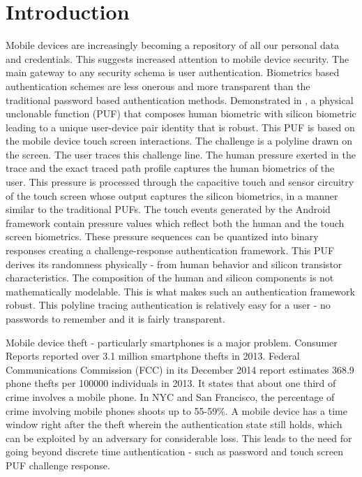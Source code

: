 \documentclass{acm_proc_article-sp}
\begin{document}
\section{Introduction}
\label{sec:intro}
Mobile devices are increasingly becoming a repository of all our personal data and credentials.
This suggests increased attention to mobile device security.
The main gateway to any security schema is user authentication.
Biometrics based authentication schemes are less onerous and 
more transparent than the traditional password based authentication methods. 
Demonstrated in \cite{ScheelTyagi15}, a physical unclonable function (PUF) that composes human biometric with silicon biometric
leading to a unique user-device pair identity that is robust.
This PUF is based on the mobile device touch screen interactions.
The challenge is a polyline drawn on the screen. The user
traces this challenge line. The human pressure exerted in the trace and the exact traced path
profile captures the human biometrics of the user. This pressure is
processed through the capacitive touch
and sensor circuitry of the touch screen whose output captures the silicon biometrics, in a 
manner similar to the traditional PUFs. The touch events generated by the Android framework
contain pressure values which reflect both the human and the touch screen biometrics.
These pressure sequences can be quantized into binary responses
creating a challenge-response authentication framework. 
This PUF derives its randomness physically - from human behavior and silicon
transistor characteristics. 
The composition of the human and silicon components is not mathematically
modelable. This is what makes such an authentication framework robust. This polyline tracing authentication is relatively easy for a user - no passwords to remember
and it is fairly transparent.
 
Mobile device theft - particularly smartphones is a major problem. Consumer Reports \cite{CR14}
reported over 3.1 million smartphone thefts in 2013. Federal Communications Commission (FCC)
\cite{FCC14}
in its December 2014 report estimates 368.9 phone thefts per 100000 individuals in 2013. It states 
that about one third of crime involves a mobile phone. In NYC and San Francisco, the percentage
of crime involving mobile phones shoots up to 55-59\%. A mobile device has a time window right after
the theft wherein the authentication state still holds, which can be exploited by an adversary for considerable loss. This leads to the need for going beyond discrete time authentication - such as
password and touch screen PUF challenge response.
\end{document}
